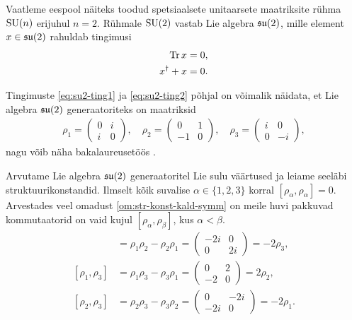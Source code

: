 \begin{naide}
    Vaatleme eespool näiteks toodud spetsiaalsete unitaarsete maatriksite
    rühma $\operatorname{SU}(n)$ erijuhul $n = 2$. Rühmale $\operatorname{SU}(2)$ vastab Lie algebra
    $\mathfrak{su}(2)$, mille
    element $x \in \mathfrak{su}(2)$ rahuldab tingimusi
    \begin{align}
        \operatorname{Tr} x = 0,\label{eq:su2-ting1} \\
        x^\dag + x = 0.\label{eq:su2-ting2}
    \end{align}

    Tingimuste \eqref{eq:su2-ting1} ja \eqref{eq:su2-ting2} põhjal
    on võimalik näidata, et Lie algebra $\mathfrak{su}(2)$ generaatoriteks
    on maatriksid
    \begin{align*}
        \rho_1 = \begin{pmatrix}
            0 & i \\
            i & 0
        \end{pmatrix},
        \quad
        \rho_2 = \begin{pmatrix}
            0 & 1 \\
            -1 & 0
        \end{pmatrix},
        \quad
        \rho_3 = \begin{pmatrix}
            i & 0 \\
            0 & -i
        \end{pmatrix},
    \end{align*}
    nagu võib näha bakalaureusetöös \cite{latt2013}.

    Arvutame Lie algebra $\mathfrak{su}(2)$ generaatoritel Lie sulu väärtused
    ja leiame seeläbi struktuurikonstandid. Ilmselt kõik suvalise
    $\alpha \in \{1, 2, 3\}$ korral $[\rho_\alpha, \rho_\alpha] = 0$.
    Arvestades veel omadust \eqref{om:str-konst-kald-symm} on meile
    huvi pakkuvad kommutaatorid on vaid kujul
    $[\rho_\alpha, \rho_\beta]$, kus $\alpha < \beta$.
    \begin{align*}
        [\rho_1, \rho_2] &= \rho_1 \rho_2 - \rho_2 \rho_1 =
            \begin{pmatrix}
                -2i &  0 \\
                  0 & 2i
            \end{pmatrix} = -2 \rho_3, \\[0.1cm]
        [\rho_1, \rho_3] &= \rho_1 \rho_3 - \rho_3 \rho_1 =
            \begin{pmatrix}
                 0 & 2 \\
                -2 & 0
            \end{pmatrix} = 2 \rho_2, \\[0.1cm]
        [\rho_2, \rho_3] &= \rho_2 \rho_3 - \rho_3 \rho_2 =
            \begin{pmatrix}
                  0 & -2i \\
                -2i & 0
            \end{pmatrix} = -2 \rho_1.
    \end{align*}


\end{naide}
